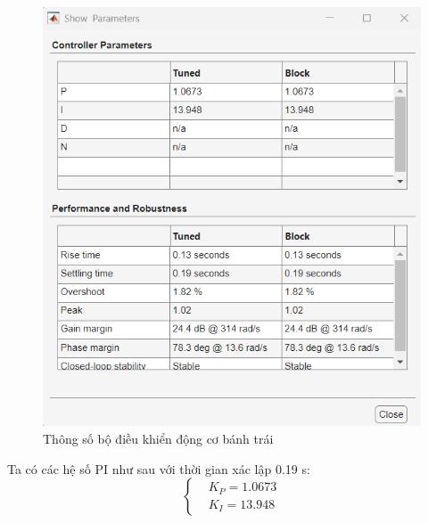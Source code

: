 \begin{itemize}
               \begin{figure}[H]
                    \centering
                    \includegraphics[width=1\textwidth]{pictures/chapter6/params_JGB2.png}
                    \caption{Thông số bộ điều khiển động cơ bánh trái}
                    \label{params_JGB2}
               \end{figure}
               \hspace*{0.6cm}Ta có các hệ số PI như sau với thời gian xác lập 0.19 s:
               \begin{equation*}
                    \begin{cases}
                         &K_P = 1.0673 \\ 
                         &K_I = 13.948
                    \end{cases}
               \end{equation*} 
          \end{itemize}

          

